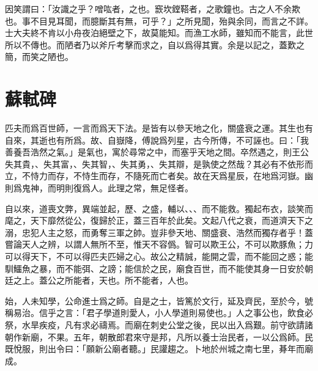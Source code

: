 因笑謂曰：「汝識之乎？噌吰者，之也。窾坎鏜鞳者，之歌鐘也。古之人不余欺也。事不目見耳聞，而臆斷其有無，可乎？」之所見聞，殆與余同，而言之不詳。士大夫終不肯以小舟夜泊絕壁之下，故莫能知。而漁工水師，雖知而不能言，此世所以不傳也。而陋者乃以斧斤考擊而求之，自以爲得其實。余是以記之，蓋歎之簡，而笑之陋也。

\section[潮州韓文公廟碑\quad{\small 蘇軾}]{{\normalsize 蘇軾}\quad {}碑}
匹夫而爲百世師，一言而爲天下法。是皆有以參天地之化，關盛衰之運。其生也有自來，其逝也有所爲。故、自嶽降，傅說爲列星，古今所傳，不可誣也。曰：「我善養吾浩然之氣。」是氣也，寓於尋常之中，而塞乎天地之間。卒然遇之，則王公失其貴，、失其富，、失其智，、失其勇，、失其{辯}，是孰使之然哉？其必有不依形而立，不恃力而存，不恃生而存，不隨死而亡者矣。故在天爲星辰，在地爲河嶽。幽則爲鬼神，而明則復爲人。此理之常，無足怪者。%

自以來，道喪文弊，異端並起，歷、之盛，輔以、、、而不能救。獨起布衣，談笑而麾之，天下靡然從公，復歸於正，蓋三百年於此矣。文起八代之衰，而道濟天下之溺，忠犯人主之怒，而勇奪三軍之帥。豈非參天地、關盛衰、浩然而獨存者乎！蓋嘗論天人之辨，以謂人無所不至，惟天不容僞。智可以欺王公，不可以欺豚魚；力可以得天下，不可以得匹夫匹婦之心。故公之精誠，能開之雲，而不能回之惑；能馴鱷魚之暴，而不能弭、之謗；能信於之民，廟食百世，而不能使其身一日安於朝廷之上。蓋公之所能者，天也。所不能者，人也。

始，人未知學，公命進士爲之師。自是之士，皆篤於文行，延及齊民，至於今，號稱易治。信乎之言：「君子學道則愛人，小人學道則易使也。」人之事公也，飲食必祭，水旱疾疫，凡有求必禱焉。而廟在刺史公堂之後，民以出入爲艱。前守欲請諸朝作新廟，不果。五年，朝散郎君來守是邦，凡所以養士治民者，一以公爲師。民既悅服，則出令曰：「願新公廟者聽。」民{讙}趨之。卜地於州城之南七里，朞年而廟成。%

